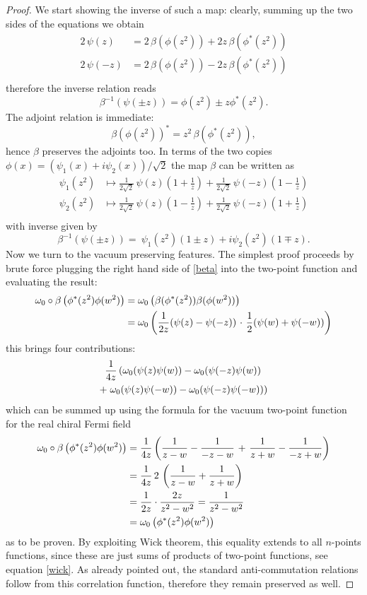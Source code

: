 \begin{proof}
We start showing the inverse of such a map: clearly, 
summing up the two sides of the equations we obtain
\begin{align*}
2\,\psi(z)&=2\,\beta(\phi(z^2)) + 2z\,\beta(\phi^*(z^2))\\
2\,\psi(-z)&=2\,\beta(\phi(z^2)) - 2z\,\beta(\phi^*(z^2))\\
\end{align*}
therefore the inverse relation reads
\[
\beta^{-1}\left(\psi(\pm z)\right)=\phi(z^2)\pm z\phi^*(z^2).
\]
The adjoint relation is immediate:
\[
\beta(\phi(z^2))^*=z^2\,\beta(\phi^*(z^2)),
\]
hence $\beta$ preserves the adjoints too.
In terms of the two copies 
$\phi(x)=\left(\psi_1(x)+i\psi_2(x)\right)/\sqrt{2}$
the map $\beta$ can be written as
\begin{align*}
\psi_1(z^2)&\mapsto\frac{1}{2\sqrt{2}}\,\psi(z)
\left(1+\frac{1}{z}\right)+\frac{1}{2\sqrt{2}}\,\psi(-z)
\left(1-\frac{1}{z}\right)\\[1ex]
\psi_2(z^2)&\mapsto\frac{1}{2\sqrt{2}}\,\psi(z)
\left(1-\frac{1}{z}\right)+\frac{1}{2\sqrt{2}}\,\psi(-z)
\left(1+\frac{1}{z}\right)\\
\end{align*}
with inverse given by
\[
\beta^{-1}\left(\psi(\pm z)\right)=\
\psi_1(z^2)(1\pm z) +i\psi_2(z^2)(1\mp z).
\]
Now we turn to the vacuum preserving features. The 
simplest proof proceeds by brute force plugging the 
right hand side of \eqref{beta} into the two-point 
function and evaluating the result:
\begin{align*}
\omega_0\circ\beta\left(\phi^*(z^2)\phi(w^2)\right)&=
\omega_0\left(\beta(\phi^*(z^2))\beta(\phi(w^2))\right)\\
&=\omega_0\left(\frac{1}{2z}(\psi(z)-\psi(-z))\right. \cdot
\left.\frac{1}{2}(\psi(w)+\psi(-w))\right)
\end{align*}
this brings four contributions:
\begin{multline*}
\frac{1}{4z}\left(\omega_0(\psi(z)\psi(w))-\omega_0(\psi(-z)\psi(w))\right. \\
+\left. \omega_0(\psi(z)\psi(-w))-\omega_0(\psi(-z)\psi(-w))\right)
\end{multline*}
which can be summed up using the formula for the vacuum 
two-point function for the real chiral Fermi field 
\begin{align*}
\omega_0\circ\beta\left(\phi^*(z^2)\phi(w^2)\right)&=
\frac{1}{4z}\left( \frac{1}{z-w}-\frac{1}{-z-w}\right. 
+\left. \frac{1}{z+w}-\frac{1}{-z+w}\right)\\
&=\frac{1}{4z}\,2\,\left(\frac{1}{z-w}+\frac{1}{z+w}\right)\\
&=\frac{1}{2z}\cdot\frac{2z}{z^2-w^2}=\frac{1}{z^2-w^2}\\
&=\omega_0\left(\phi^*(z^2)\phi(w^2)\right)
\end{align*}
as to be proven. By exploiting Wick theorem, this 
equality extends to all $n$-points functions, since 
these are just sums of products of two-point functions,
see equation \eqref{wick}. As already pointed out, the 
standard anti-commutation relations follow from this
correlation function, therefore they remain preserved as
well.


\end{proof}
